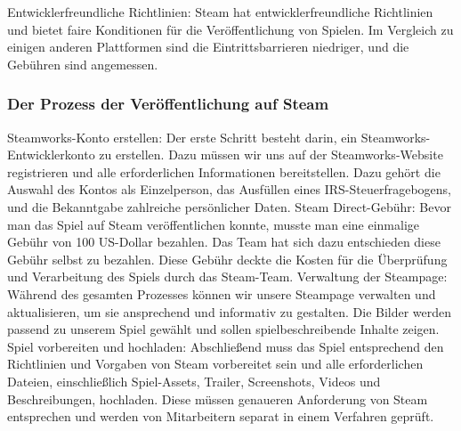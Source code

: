 Entwicklerfreundliche Richtlinien: Steam hat entwicklerfreundliche Richtlinien und bietet faire Konditionen für die Veröffentlichung von Spielen. Im Vergleich zu einigen anderen Plattformen sind die Eintrittsbarrieren niedriger, und die Gebühren sind angemessen.

\subsubsection{Der Prozess der Veröffentlichung auf Steam}\label{subsubsec:Veröffentlichungsprozess}

Steamworks-Konto erstellen: Der erste Schritt besteht darin, ein Steamworks-Entwicklerkonto zu erstellen. Dazu müssen wir uns auf der Steamworks-Website registrieren und alle erforderlichen Informationen bereitstellen. Dazu gehört die Auswahl des Kontos als Einzelperson, das Ausfüllen eines IRS-Steuerfragebogens, und die Bekanntgabe zahlreiche persönlicher Daten.
%
Steam Direct-Gebühr: Bevor man das Spiel auf Steam veröffentlichen konnte, musste man eine einmalige Gebühr von 100 US-Dollar bezahlen. Das Team hat sich dazu entschieden diese Gebühr selbst zu bezahlen. Diese Gebühr deckte die Kosten für die Überprüfung und Verarbeitung des Spiels durch das Steam-Team.
%
Verwaltung der Steampage: Während des gesamten Prozesses können wir unsere Steampage verwalten und aktualisieren, um sie ansprechend und informativ zu gestalten. Die Bilder werden passend zu unserem Spiel gewählt und sollen spielbeschreibende Inhalte zeigen.
%
Spiel vorbereiten und hochladen: Abschließend muss das Spiel entsprechend den Richtlinien und Vorgaben von Steam vorbereitet sein und alle erforderlichen Dateien, einschließlich Spiel-Assets, Trailer, Screenshots, Videos und Beschreibungen, hochladen. Diese müssen genaueren Anforderung von Steam entsprechen und werden von Mitarbeitern separat in einem Verfahren geprüft.

